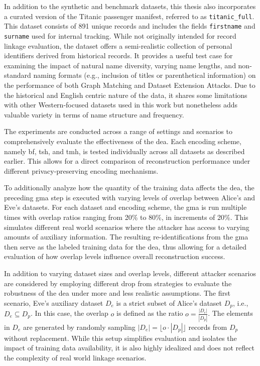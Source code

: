In addition to the synthetic and benchmark datasets, this thesis also incorporates a curated version of the Titanic passenger manifest, referred to as \texttt{titanic\_full}.
This dataset consists of 891 unique records and includes the fields \texttt{firstname} and \texttt{surname} used for internal tracking.
While not originally intended for record linkage evaluation, the dataset offers a semi-realistic collection of personal identifiers derived from historical records.
It provides a useful test case for examining the impact of natural name diversity, varying name lengths, and non-standard naming formats (e.g., inclusion of titles or parenthetical information) on the performance of both Graph Matching and Dataset Extension Attacks.
Due to the historical and English centric nature of the data, it shares some limitations with other Western-focused datasets used in this work but nonetheless adds valuable variety in terms of name structure and frequency.

The experiments are conducted across a range of settings and scenarios to comprehensively evaluate the effectiveness of the \ac{dea}.
Each encoding scheme, namely \ac{bf}, \ac{tsh}, and \ac{tmh}, is tested individually across all datasets as described earlier.
This allows for a direct comparison of reconstruction performance under different privacy-preserving encoding mechanisms.

To additionally analyze how the quantity of the training data affects the \ac{dea}, the preceding \ac{gma} step is executed with varying levels of overlap between Alice's and Eve's datasets.
For each dataset and encoding scheme, the \ac{gma} is run multiple times with overlap ratios ranging from 20\% to 80\%, in increments of 20\%.
This simulates different real world scenarios where the attacker has access to varying amounts of auxiliary information.
The resulting re-identifications from the \ac{gma} then serve as the labeled training data for the \ac{dea}, thus allowing for a detailed evaluation of how overlap levels influence overall reconstruction success.

In addition to varying dataset sizes and overlap levels, different attacker scenarios are considered by employing different drop from strategies to evaluate the robustness of the \ac{dea} under more and less realistic assumptions.
The first scenario, Eve's auxiliary dataset $D_e$ is a strict subset of Alice's dataset $D_p$, i.e., $D_e \subseteq D_p$.
In this case, the overlap $o$ is defined as the ratio $o = \frac{|D_e|}{|D_p|}$.
The elements in $D_e$ are generated by randomly sampling $|D_e| = \lfloor o \cdot |D_p| \rfloor$ records from $D_p$ without replacement.
While this setup simplifies evaluation and isolates the impact of training data availability, it is also highly idealized and does not reflect the complexity of real world linkage scenarios.

